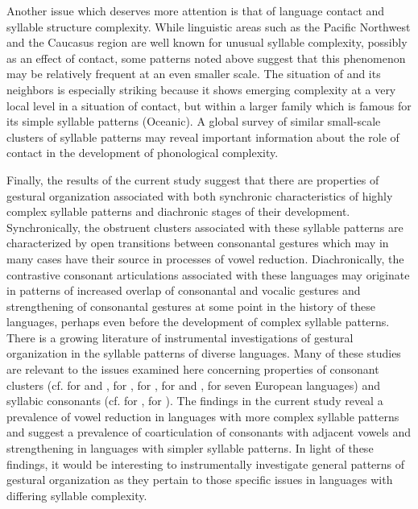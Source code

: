   Another issue which deserves more attention is that of language contact and syllable structure complexity. While linguistic areas such as the Pacific Northwest and the Caucasus region are well known for unusual syllable complexity, possibly as an effect of contact, some patterns noted above suggest that this phenomenon may be relatively frequent at an even smaller scale. The situation of  and its neighbors is especially striking because it shows emerging complexity at a very local level in a situation of contact, but within a larger family which is famous for its simple syllable patterns (Oceanic). A global survey of similar small-scale clusters of syllable patterns may reveal important information about the role of contact in the development of phonological complexity.

  Finally, the results of the current study suggest that there are properties of gestural organization associated with both synchronic characteristics of highly complex syllable patterns and diachronic stages of their development. Synchronically, the obstruent clusters associated with these syllable patterns are characterized by open transitions between consonantal gestures which may in many cases have their source in processes of vowel reduction. Diachronically, the contrastive consonant articulations associated with these languages may originate in patterns of increased overlap of consonantal and vocalic gestures and strengthening of consonantal gestures at some point in the history of these languages, perhaps even before the development of complex syllable patterns. There is a growing literature of instrumental investigations of gestural organization in the syllable patterns of diverse languages. Many of these studies are relevant to the issues examined here concerning properties of consonant clusters (cf. \citealt{GoldsteinEtAl2007} for  and , \citealt{HermesEtAl2013} for , \citealt{Marin2014} for , \citealt{Butler2015} for  and , \citealt{MarinEtAl2017} for seven European languages) and syllabic consonants (cf. \citealt{HermesEtAl2011} for , \citealt{PouplierBeňuš2011} for ). The findings in the current study reveal a prevalence of vowel reduction in languages with more complex syllable patterns and suggest a prevalence of coarticulation of consonants with adjacent vowels and strengthening in languages with simpler syllable patterns. In light of these findings, it would be interesting to instrumentally investigate general patterns of gestural organization as they pertain to those specific issues in languages with differing syllable complexity.
